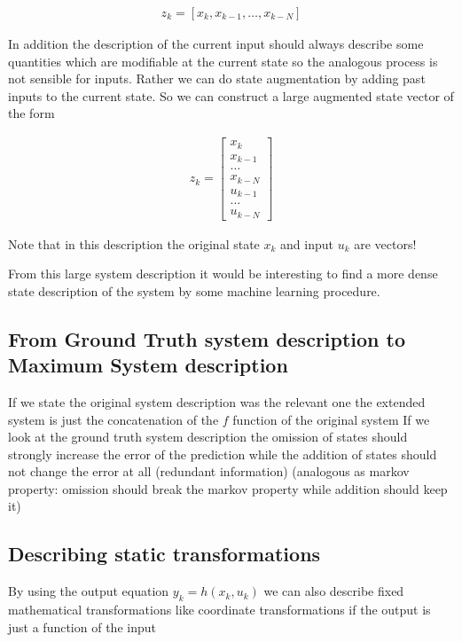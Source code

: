 \documentclass[a4paper, 10pt]{article}
\begin{document}
\begin{align*}
z_k = [x_k, x_{k-1}, \dots , x_{k-N}]
\end{align*}

In addition the description of the current input should always describe some quantities which are modifiable at the current state so the analogous process is not sensible for inputs.
Rather we can do state augmentation by adding past inputs to the current state.
So we can construct a large augmented state vector of the form

\begin{align*}
z_k =
\begin{bmatrix}
x_k \\
x_{k-1} \\
\dots \\
x_{k-N} \\
u_{k-1} \\
\dots \\
u_{k-N}
\end{bmatrix}
\end{align*}

Note that in this description the original state $x_k$ and input $u_k$ are vectors!

From this large system description it would be interesting to find a more dense state description of the system by some machine learning procedure.

\subsection*{From Ground Truth system description to Maximum System description}

If we state the original system description was the relevant one the extended system is just the concatenation of the $f$ function of the original system
If we look at the ground truth system description  the omission of states should strongly increase the error of the prediction while the addition of states should not change the error at all (redundant information) (analogous as markov property: omission should break the markov property while addition should keep it)

\subsection*{Describing static transformations}

By using the output equation $y_k=h(x_k,u_k)$ we can also describe fixed mathematical transformations like coordinate transformations if the output is just a function of the input
\end{document}
